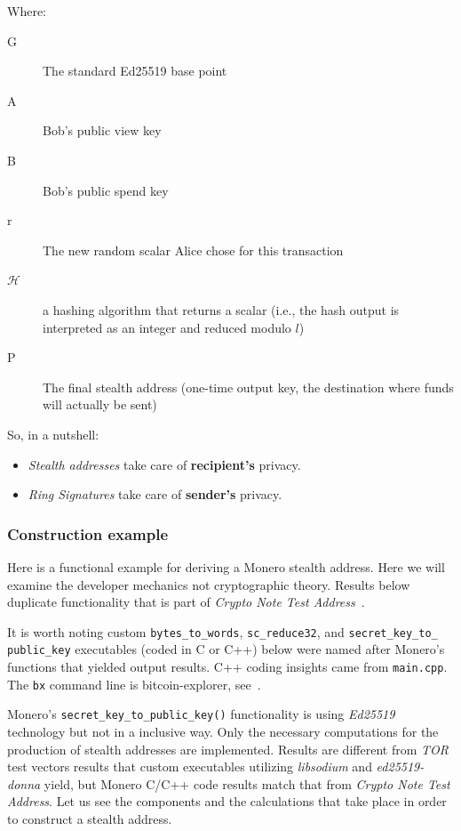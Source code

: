 \noindent Where:
\begin{description}
  \item [G] The standard Ed25519 base point
  \item [A] Bob's public view key
  \item [B] Bob's public spend key
  \item [r] The new random scalar Alice chose for this transaction
  \item [$\mathcal{H}$] a hashing algorithm that returns a scalar (i.e., the hash output is interpreted as an integer and reduced modulo $l$)
  \item [P] The final stealth address (one-time output key, the destination where funds will actually be sent)
\end{description}
So, in a nutshell:
\begin{itemize}
  \item \emph{Stealth addresses} take care of \textbf{recipient's} privacy.
  \item \emph{Ring Signatures} take care of \textbf{sender's} privacy.
\end{itemize}

\subsubsection{Construction example} %
Here is a functional example for deriving a Monero stealth address. Here we will examine the developer mechanics not cryptographic theory. Results below duplicate functionality that is part of \emph{Crypto Note Test Address}~\cite{teststealth}.

It is worth noting custom \verb|bytes_to_words|, \verb|sc_reduce32|, and \verb|secret_key_to_| \verb|public_key| executables (coded in C or C++) below were named after Monero's functions that yielded output results. C++ coding insights came from \verb|main.cpp|. The \verb|bx| command line is bitcoin-explorer, see~\cite{bx}.

Monero's \verb|secret_key_to_public_key()| functionality is using \emph{Ed25519} technology but not in a inclusive way. Only the necessary computations for the production of stealth addresses are implemented. Results are different from \emph{TOR} test vectors results that custom executables utilizing \emph{libsodium} and \emph{ed25519-donna} yield, but Monero C/C++ code results match that from \emph{Crypto Note Test Address}. Let us see the components and the calculations that take place in order to construct a stealth address.

